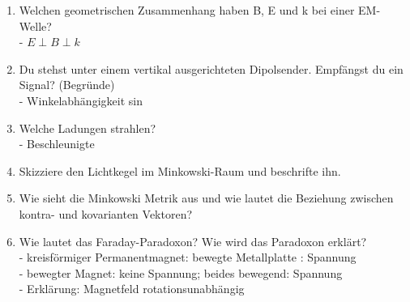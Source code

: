 \begin{enumerate}
  \item Welchen geometrischen Zusammenhang haben B, E und k bei einer EM-Welle? \\
  - $E \perp B \perp k $

  \item Du stehst unter einem vertikal ausgerichteten Dipolsender. Empfängst du ein Signal? (Begründe) \\
  - Winkelabhängigkeit sin

  \item Welche Ladungen strahlen? \\
  - Beschleunigte

  \item Skizziere den Lichtkegel im Minkowski-Raum und beschrifte ihn. \\

  \item Wie sieht die Minkowski Metrik aus und wie lautet die Beziehung zwischen kontra- und kovarianten Vektoren? \\

  \item Wie lautet das Faraday-Paradoxon? Wie wird das Paradoxon erklärt? \\
  - kreisförmiger Permanentmagnet: bewegte Metallplatte : Spannung \\
  - bewegter Magnet: keine Spannung; beides bewegend: Spannung \\
  - Erklärung: Magnetfeld rotationsunabhängig

\end{enumerate}


